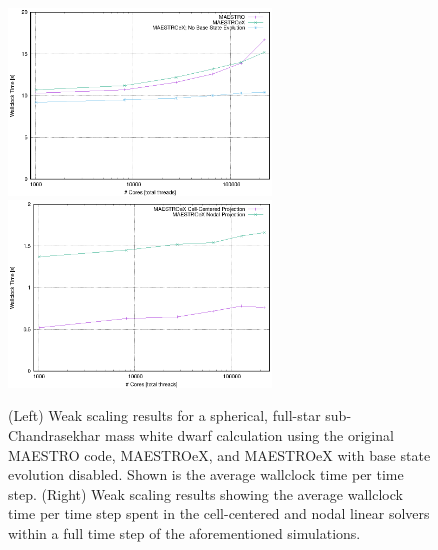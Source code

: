 \begin{figure}[htb]
\begin{center}
\includegraphics[width=2.75in]{./figs/MAESTRO_scaling1}
\includegraphics[width=2.75in]{./figs/MAESTRO_scaling2}
\caption{\label{fig:scaling} (Left) Weak scaling results for a spherical, full-star sub-Chandrasekhar mass white dwarf calculation using the original MAESTRO code, MAESTROeX, and MAESTROeX with base state evolution disabled.  Shown is the average wallclock time per time step.
(Right) Weak scaling results showing the average wallclock time per time step spent in the cell-centered and nodal linear solvers within a full time step of the aforementioned simulations.}
\end{center}
\end{figure}

